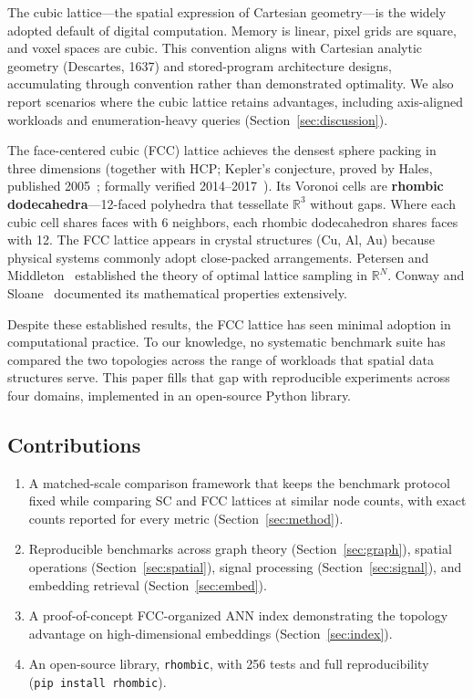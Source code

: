 \documentclass[11pt]{article}
\begin{document}
The cubic lattice---the spatial expression of Cartesian geometry---is
the widely adopted default of digital computation. Memory is linear,
pixel grids are square, and voxel spaces are cubic. This convention
aligns with Cartesian analytic geometry
(Descartes, 1637) and stored-program architecture designs, accumulating
through convention rather than demonstrated optimality. We also
report scenarios where the cubic lattice retains advantages, including
axis-aligned workloads and enumeration-heavy queries
(Section~\ref{sec:discussion}).

The face-centered cubic (FCC) lattice achieves the densest sphere
packing in three dimensions (together with HCP; Kepler's conjecture,
proved by Hales, published 2005~\cite{hales2005}; formally verified
2014--2017~\cite{hales2017}). Its Voronoi cells are \textbf{rhombic
dodecahedra}---12-faced polyhedra that tessellate $\mathbb{R}^3$
without gaps. Where each cubic cell shares faces with 6 neighbors,
each rhombic dodecahedron shares faces with 12. The FCC lattice
appears in crystal structures (Cu, Al, Au) because physical systems commonly adopt
close-packed arrangements. Petersen and Middleton~\cite{petersen1962}
established the theory of optimal lattice sampling in
$\mathbb{R}^N$. Conway and
Sloane~\cite{conway1999} documented its mathematical properties
extensively.

Despite these established results, the FCC lattice has seen minimal
adoption in computational practice. To our knowledge, no systematic
benchmark suite has compared the two topologies across the range of workloads that
spatial data structures serve. This paper fills that gap with
reproducible experiments across four domains, implemented in an
open-source Python library.

\subsection{Contributions}

\begin{enumerate}
  \item A matched-scale comparison framework that keeps the benchmark
    protocol fixed while comparing SC and FCC lattices at similar node
    counts, with exact counts reported for every metric
    (Section~\ref{sec:method}).
  \item Reproducible benchmarks across graph theory
    (Section~\ref{sec:graph}), spatial operations
    (Section~\ref{sec:spatial}), signal processing
    (Section~\ref{sec:signal}), and embedding retrieval
    (Section~\ref{sec:embed}).
  \item A proof-of-concept FCC-organized ANN index demonstrating
    the topology advantage on high-dimensional embeddings
    (Section~\ref{sec:index}).
  \item An open-source library, \texttt{rhombic}, with 256 tests
    and full reproducibility (\texttt{pip~install~rhombic}).
\end{enumerate}
\end{document}
